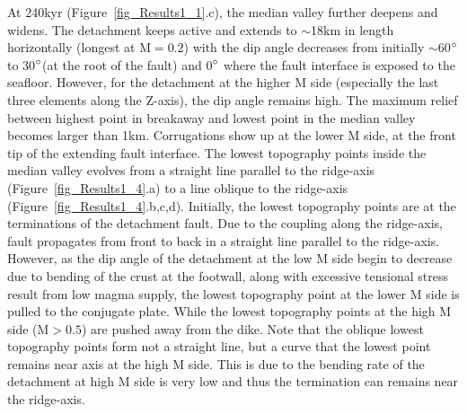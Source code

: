 At 240kyr (Figure~\ref{fig_Results1_1}.c), the median valley further deepens and widens. The detachment keeps active and extends to $\sim$18km in length horizontally (longest at M$=0.2$) with the dip angle decreases from initially $\sim$60$\degree$ to 30$\degree$(at the root of the fault) and 0$\degree$ where the fault interface is exposed to the seafloor. However, for the detachment at the higher M side (especially the last three elements along the Z-axis), the dip angle remains high. The maximum relief between highest point in breakaway and lowest point in the median valley becomes larger than 1km. Corrugations show up at the lower M side, at the front tip of the extending fault interface. The lowest topography points inside the median valley evolves from a straight line parallel to the ridge-axis (Figure~\ref{fig_Results1_4}.a) to a line oblique to the ridge-axis (Figure~\ref{fig_Results1_4}.b,c,d). Initially, the lowest topography points are at the terminations of the detachment fault. Due to the coupling along the ridge-axis, fault propagates from front to back in a straight line parallel to the ridge-axis. However, as the dip angle of the detachment at the low M side begin to decrease due to bending of the crust at the footwall, along with excessive tensional stress result from low magma supply, the lowest topography point at the lower M side is pulled to the conjugate plate. While the lowest topography points at the high M side (M$>0.5$) are pushed away from the dike. Note that the oblique lowest topography points form not a straight line, but a curve that the lowest point remains near axis at the high M side. This is due to the bending rate of the detachment at high M side is very low and thus the termination can remains near the ridge-axis.      


